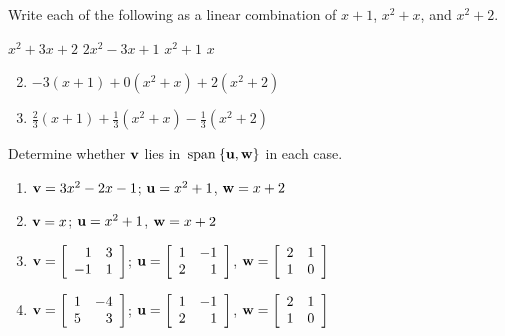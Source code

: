 \begin{multicols}{2}
\begin{ex}
\begin{sol}
\begin{enumerate}[label={\alph*.}]
\end{enumerate}
\end{sol}
\end{ex}

\begin{ex}
Write each of the following as a linear combination of $x + 1$, $x^{2} + x$, and $x^{2} + 2$.

\begin{exenumerate}
\exitem $x^{2} + 3x + 2$
\exitem $2x^{2} - 3x + 1$
\exitem $x^{2} + 1$
\exitem $x$
\end{exenumerate}
\begin{sol}
\begin{enumerate}[label={\alph*.}]
\setcounter{enumi}{1}
\item  $-3(x + 1) + 0(x^{2} + x) + 2(x^{2} + 2)$

\setcounter{enumi}{3}
\item  $\frac{2}{3}(x + 1) + \frac{1}{3}(x^{2} + x) - \frac{1}{3}(x^{2} + 2)$

\end{enumerate}
\end{sol}
\end{ex}

\begin{ex}
Determine whether $\textbf{v}$ lies in $\thinspace\operatorname{span\medspace}\{\textbf{u}, \textbf{w}\}$ in each case.

\begin{enumerate}[label={\alph*.}]
\item $\textbf{v} = 3x^{2} - 2x - 1$; $\textbf{u} = x^{2} + 1$, $\textbf{w} = x + 2$

\item $\textbf{v} = x$; $\textbf{u} = x^{2} + 1$, $\textbf{w} = x + 2$

\item $\textbf{v} =
\left[ \begin{array}{rr}
1 & 3 \\
-1 & 1
\end{array} \right]$;  $\textbf{u} = 
\left[ \begin{array}{rr}
1 & -1 \\
2 & 1
\end{array} \right]$, $\textbf{w} = 
\left[ \begin{array}{rr}
2 & 1 \\
1 & 0
\end{array} \right]$

\item $\textbf{v} =
\left[ \begin{array}{rr}
1 & -4 \\
5 & 3
\end{array} \right]$; $\textbf{u} = 
\left[ \begin{array}{rr}
1 & -1 \\
2 & 1
\end{array} \right]$, $\textbf{w} = 
\left[ \begin{array}{rr}
2 & 1 \\
1 & 0
\end{array} \right]$


\end{enumerate}
\end{ex}
\end{multicols}

